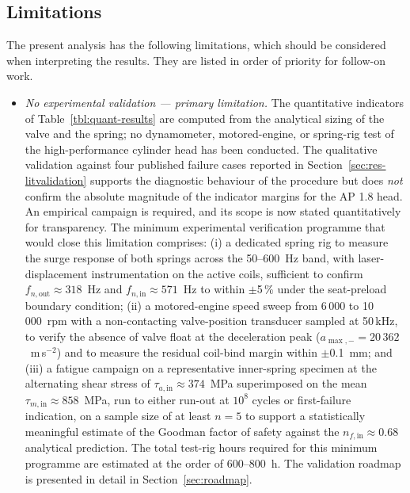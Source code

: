 \subsection{Limitations}\label{sec:disc-limitations}

The present analysis has the following limitations, which should be
considered when interpreting the results. They are listed in order
of priority for follow-on work.

\begin{itemize}
\item \emph{No experimental validation --- primary limitation.} The
quantitative indicators of Table~\ref{tbl:quant-results} are
computed from the analytical sizing of the valve and the spring;
no dynamometer, motored-engine, or spring-rig test of the
high-performance cylinder head has been conducted. The qualitative
validation against four published failure cases reported in
Section~\ref{sec:res-litvalidation} supports the diagnostic
behaviour of the procedure but does \emph{not} confirm the absolute
magnitude of the indicator margins for the AP 1.8 head. An
empirical campaign is required, and its scope is now stated
quantitatively for transparency. The minimum experimental
verification programme that would close this limitation comprises:
(i) a dedicated spring rig to measure the surge response of both
springs across the 50--600~Hz band, with laser-displacement
instrumentation on the active coils, sufficient to confirm
$f_{n,\mathrm{out}}\approx 318$~Hz and
$f_{n,\mathrm{in}}\approx 571$~Hz to within $\pm$5\,\% under the
seat-preload boundary condition; (ii) a motored-engine speed sweep
from 6\,000 to 10\,000~rpm with a non-contacting valve-position
transducer sampled at 50\,kHz, to verify the absence of valve
float at the deceleration peak ($a_{\max,-}=20\,362$~m\,s$^{-2}$)
and to measure the residual coil-bind margin within $\pm$0.1~mm;
and (iii) a fatigue campaign on a representative inner-spring
specimen at the alternating shear stress of
$\tau_{a,\mathrm{in}}\approx 374$~MPa superimposed on the mean
$\tau_{m,\mathrm{in}}\approx 858$~MPa, run to either run-out at
$10^{8}$ cycles or first-failure indication, on a sample size of
at least $n=5$ to support a statistically meaningful estimate of
the Goodman factor of safety against the
$n_{f,\mathrm{in}}\approx 0.68$ analytical prediction. The total
test-rig hours required for this minimum programme are estimated
at the order of 600--800~h. The validation roadmap is presented in
detail in Section~\ref{sec:roadmap}.

\end{itemize}
